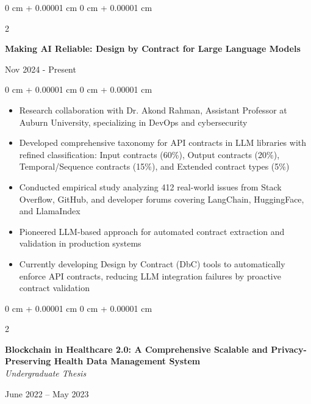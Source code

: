 \documentclass[10pt, letterpaper]{article}
\newenvironment{highlights}{
    \begin{itemize}[
        topsep=0.10 cm,
        parsep=0.10 cm,
        partopsep=0pt,
        itemsep=0pt,
        leftmargin=0 cm + 10pt
    ]
}{
    \end{itemize}
} %
\newenvironment{onecolentry}{
    \begin{adjustwidth}{
        0 cm + 0.00001 cm
    }{
        0 cm + 0.00001 cm
    }
}{
    \end{adjustwidth}
} %
\newenvironment{twocolentry}[2][]{
    \onecolentry
    \def\secondColumn{#2}
    \setcolumnwidth{\fill, 4.5 cm}
    \begin{paracol}{2}
}{
    \switchcolumn \raggedleft \secondColumn
    \end{paracol}
    \endonecolentry
} %
\begin{document}
\begin{twocolentry}{
    Nov 2024 - Present
}
\textbf{Making AI Reliable: Design by Contract for Large Language Models}
\end{twocolentry}

\begin{onecolentry}
    \begin{highlights}
        \item Research collaboration with Dr. Akond Rahman, Assistant Professor at Auburn University, specializing in DevOps and cybersecurity
        \item Developed comprehensive taxonomy for API contracts in LLM libraries with refined classification: Input contracts (60\%), Output contracts (20\%), Temporal/Sequence contracts (15\%), and Extended contract types (5\%)
        \item Conducted empirical study analyzing 412 real-world issues from Stack Overflow, GitHub, and developer forums covering LangChain, HuggingFace, and LlamaIndex
        \item Pioneered LLM-based approach for automated contract extraction and validation in production systems
        \item Currently developing Design by Contract (DbC) tools to automatically enforce API contracts, reducing LLM integration failures by proactive contract validation
    \end{highlights}
\end{onecolentry}

\begin{twocolentry}{
    {June 2022 – May 2023}
}
    \textbf{Blockchain in Healthcare 2.0: A Comprehensive Scalable and Privacy-Preserving Health Data Management System} \\
    \textit{Undergraduate Thesis}
\end{twocolentry}
\end{document}
